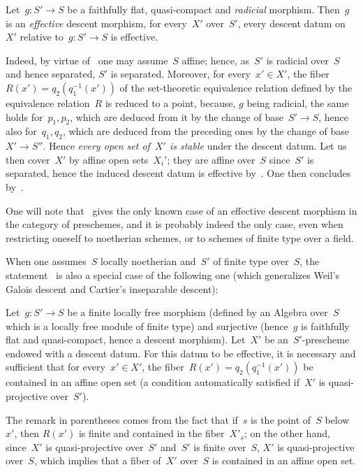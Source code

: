 \begin{corollary}
\label{VIII.7.5}
Let~$g\colon S'\to S$ be a faithfully flat, quasi-compact
and \emph{radicial} morphism. Then~$g$ is an
\emph{effective} descent morphism, \ie for every~$X'$ over~$S'$, every
descent datum on~$X'$ relative to~$g\colon S'\to S$ is effective.
\end{corollary}

Indeed, by virtue of~ one may assume~$S$ affine; hence,
as~$S'$ is radicial over~$S$ and hence separated, $S'$ is
separated. Moreover, for every~$x'\in X'$, the
fiber~$R(x')=q_{2}(q_{1}^{-1}(x'))$ of the set-theoretic equivalence
relation defined
by the equivalence relation~$R$ is reduced to a point,
because, $g$ being radicial, the same holds for~$p_{1},p_{2}$, which
are deduced from it by the change of base~$S'\to S$, hence also
for~$q_{1},q_{2}$, which are deduced from the preceding ones by the
change of base~$X'\to S''$. Hence \emph{every open set of~$X'$ is
stable} under the descent datum. Let us then cover~$X'$ by
affine open sets~$X_{i}'$; they are affine over~$S$ since~$S'$ is
separated, hence the induced descent datum is effective
by~. One then concludes by~.

One will note that~ gives the only known case of an
effective descent morphism in the category of preschemes, and
it is probably indeed the only case, even when restricting oneself to
noetherian schemes, or to schemes of finite type over a
field.

When one assumes~$S$ locally noetherian and~$S'$ of finite type
over~$S$, the statement~ is also a special case
of the following one (which generalizes Weil's Galois descent and
Cartier's inseparable descent):

\begin{corollary}
\label{VIII.7.6}
Let~$g\colon S'\to S$ be a finite locally free morphism
(\ie defined by an Algebra over~$S$ which is a
locally free module of finite type) and surjective (hence~$g$ is
faithfully flat and quasi-compact, hence a descent
morphism). Let~$X'$ be an~$S'$-prescheme endowed with a descent
datum. For this datum to be effective, it is necessary and
sufficient that for every~$x'\in X'$, the
fiber~$R(x')=q_{2}(q_{1}^{-1}(x'))$ be contained in an affine open
set (a condition automatically satisfied if~$X'$ is
quasi-projective over~$S'$).
\end{corollary}

The remark in parentheses comes from the fact that if~$s$ is the
point of~$S$ below~$x'$, then $R(x')$ is finite and contained
in the
fiber~$X'_{s}$;
on the other hand, since~$X'$ is quasi-projective over~$S'$ and~$S'$ is finite
over~$S$, $X'$ is quasi-projective over~$S$, which implies that a
fiber
of~$X'$ over~$S$
is contained in an affine open set.

